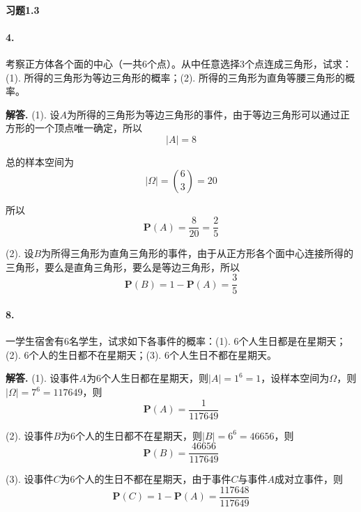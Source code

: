 \documentclass[12pt, a4paper, oneside]{ctexart}
\newenvironment{solution}{\par\noindent\textbf{解答. }}{\bigskip\par}
\begin{document}
\paragraph{习题1.3}
\paragraph{4.}考察正方体各个面的中心（一共$6$个点）。从中任意选择$3$个点连成三角形，试求：
(1). 所得的三角形为等边三角形的概率；(2). 所得的三角形为直角等腰三角形的概率。
\begin{solution}
    (1). 设$A$为所得的三角形为等边三角形的事件，由于等边三角形可以通过正方形的一个顶点唯一确定，所以
    \begin{equation*}
        |A| = 8
    \end{equation*}

    总的样本空间为
    \begin{equation*}
        |\Omega| = \binom{6}{3} = 20
    \end{equation*}

    所以
    \begin{equation*}
        \textbf{P}(A) = \frac{8}{20} = \frac{2}{5}
    \end{equation*}

    (2). 设$B$为所得三角形为直角三角形的事件，由于从正方形各个面中心连接所得的三角形，要么是直角三角形，要么是等边三角形，所以
    \begin{equation*}
        \textbf{P}(B) = 1-\textbf{P}(A) = \frac{3}{5}
    \end{equation*}
\end{solution}
\paragraph{8.}一学生宿舍有$6$名学生，试求如下各事件的概率：(1). $6$个人生日都是在星期天；(2). $6$个人的生日都不在星期天；(3). $6$个人生日不都在星期天。
\begin{solution}
    (1). 设事件$A$为$6$个人生日都在星期天，则$|A| = 1^6 = 1$，设样本空间为$\Omega$，则$|\Omega| = 7^6 = 117649$，则
    \begin{equation*}
        \textbf{P}(A) = \frac{1}{117649}
    \end{equation*}

    (2). 设事件$B$为$6$个人的生日都不在星期天，则$|B| = 6^6 = 46656$，则
    \begin{equation*}
        \textbf{P}(B) = \frac{46656}{117649}
    \end{equation*}

    (3). 设事件$C$为$6$个人的生日不都在星期天，由于事件$C$与事件$A$成对立事件，则
    \begin{equation*}
        \textbf{P}(C) = 1-\textbf{P}(A) = \frac{117648}{117649}
    \end{equation*}
\end{solution}
\end{document}
